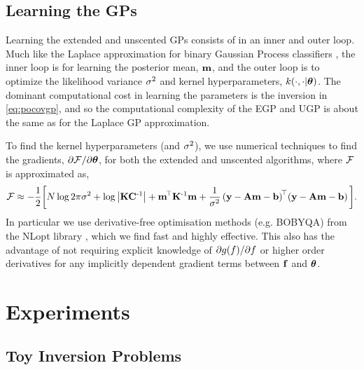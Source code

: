 \documentclass{article} %
\begin{document}
\subsection{Learning the GPs}

Learning the extended and unscented GPs consists of in an inner and outer loop.
Much like the Laplace approximation for binary Gaussian Process classifiers
\cite{Rasmussen2006}, the inner loop is for learning the posterior mean,
$\mathbf{m}$, and the outer loop is to optimize the likelihood variance $\sigma^2$
and kernel hyperparameters, $k\!\left({{\cdot}, {\cdot|\boldsymbol\theta}}\right)$. The dominant
computational cost in learning the parameters is the inversion in
\eqref{eq:pocovgp}, and so the computational complexity of the EGP and UGP is
about the same as for the Laplace GP approximation.

To find the kernel hyperparameters (and $\sigma^2$), we use numerical techniques
to find the gradients, $\partial\mathcal{F}/\partial\boldsymbol\theta$, for both the extended
and unscented algorithms, where $\mathcal{F}$ is approximated as,
\begin{equation}
    \mathcal{F} \approx - \frac{1}{2} \bigg[
        N\log{2\pi\ensuremath{\sigma^2}} + \log\left|{\mathbf{K}\mathbf{C}^{\text{-}1}}\right|
    + \mathbf{m}^{\!\top}\mathbf{K}^{\text{-}1} \mathbf{m}
    + \frac{1}{\sigma^2}
        \left({\mathbf{y} - \mathbf{A}\mathbf{m} - \mathbf{b}}\right)^{\!\top}\!
        \left({\mathbf{y} - \mathbf{A}\mathbf{m} - \mathbf{b}}\right)
    \bigg].
    \label{eq:fengygp}
\end{equation}
In particular we use derivative-free optimisation methods (e.g. BOBYQA)
from the NLopt library \cite{JohnsonNLOPT}, which we find fast and highly
effective. This also has the advantage of not requiring explicit knowledge of
$\partial g\!\left({{f}}\right)\!/\partial f$ or higher order derivatives for
any implicitly dependent gradient terms between $\mathbf{f}$ and $\boldsymbol\theta$. 


\section{Experiments}
\label{sec:experiments}



\subsection{Toy Inversion Problems}
\label{sec:exptoy}
\end{document}

